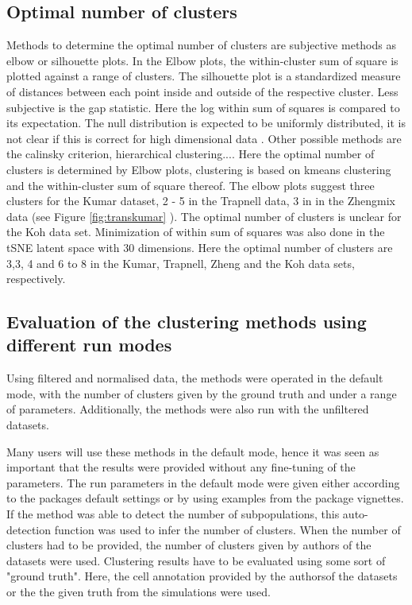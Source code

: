 \documentclass[11pt, a4paper]{article}\usepackage[]{graphicx}\usepackage[]{color}
\begin{document}
\subsection{Optimal number of clusters}
Methods to determine the optimal number of clusters are subjective methods as elbow or silhouette plots. In the Elbow plots, the within-cluster sum of square is plotted against a range of clusters. The silhouette plot is a standardized measure of distances between each point inside and outside of the respective cluster. Less subjective is the gap statistic. Here the log within sum of squares is compared to its expectation. The null distribution is expected to be uniformly distributed, it is not clear if this is correct for high dimensional data \citep{tibshirani2001estimating}. Other possible methods are the calinsky criterion, hierarchical clustering....
Here the optimal number of clusters is determined by Elbow plots, clustering is based on kmeans clustering and the within-cluster sum of square thereof.
The elbow plots suggest three clusters for the Kumar dataset, 2 - 5 in the Trapnell data, 3 in in the Zhengmix data (see Figure \ref{fig:transkumar} ). The optimal number of clusters is unclear for the Koh data set. 
Minimization of within sum of squares was also done in the tSNE latent space with 30 dimensions. Here the optimal number of clusters are 3,3, 4 and 6 to 8  in the Kumar, Trapnell, Zheng and the Koh data sets, respectively.

\newpage
\subsection{Evaluation of the clustering methods using different run modes}
Using filtered and normalised data, the methods were operated in the default mode, with the number of clusters given by the ground truth and under a range of parameters. Additionally, the methods were also run with the unfiltered datasets. 

Many users will use these methods in the default mode, hence it was seen as important that the results were provided without any fine-tuning of the parameters.
The run parameters in the default mode were given either according to the packages default settings or by using examples from the package vignettes. If the method was able to detect the number of subpopulations, this auto-detection function was used to infer the number of clusters. When the number of clusters had to be provided, the number of clusters given by  authors of the datasets were used. Clustering results have to be evaluated using some sort of "ground truth". Here, the cell annotation provided by the authorsof the datasets or the the given truth from the simulations were used.
\end{document}

